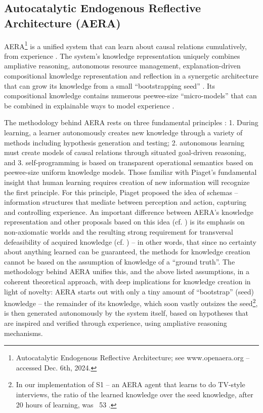 \documentclass[runningheads]{llncs}
\begin{document}
\subsection{Autocatalytic Endogenous Reflective Architecture (AERA)}

AERA\footnote{Autocatalytic Endogenous Reflective Architecture; see www.openaera.org – accessed Dec. 6th, 2024.} is a unified system that can learn about causal relations cumulatively, from experience \cite{thorisson2019cumulative,thorisson2014autonomous,nivel2013autocatalytic}. The system’s knowledge representation uniquely combines ampliative reasoning, autonomous resource management, explanation-driven compositional knowledge representation and reflection in a synergetic architecture that can grow its knowledge from a small “bootstrapping seed” \cite{thorisson2020seed}. Its compositional knowledge contains numerous peewee-size “micro-models” that can be combined in explainable ways to model experience \cite{thorisson2021explanation}. 

The methodology behind AERA rests on three fundamental principles \cite{thorisson_seed-programmed_2020,thorisson2012new,nivel2009self}: 1. During learning, a learner autonomously creates new knowledge through a variety of methods including hypothesis generation and testing; 2. autonomous learning must create models of causal relations through situated goal-driven reasoning, and 3. self-programming is based on transparent operational semantics based on peewee-size uniform knowledge models. Those familiar with Piaget’s \cite{berlyne2003psychology} fundamental insight that human learning requires creation of new information will recognize the first principle. For this principle, Piaget proposed the idea of schemas – information structures that mediate between perception and action, capturing and controlling experience. An important difference between AERA’s knowledge representation and other proposals based on this idea (cf. \cite{arbib2003handbook,drescher_made-up_1991}) is its emphasis on non-axiomatic worlds and the resulting strong requirement for transversal defeasibility of acquired knowledge (cf. \cite{pollock1987defeasible}) – in other words, that since no certainty about anything learned can be guaranteed, the methods for knowledge creation cannot be based on the assumption of knowledge of a “ground truth”. The methodology behind AERA unifies this, and the above listed assumptions, in a coherent theoretical approach, with deep implications for knowledge creation in light of novelty: AERA starts out with only a tiny amount of “bootstrap” (seed) knowledge – the remainder of its knowledge, which soon vastly outsizes the seed\footnote{In our implementation of S1 – an AERA agent that learns to do TV-style interviews, the ratio of the learned knowledge over the seed knowledge, after 20 hours of learning, was ~53 \cite{thorisson2014autonomous}.}, is then generated autonomously by the system itself, based on hypotheses that are inspired and verified through experience, using ampliative reasoning mechanisms. 
\end{document}
